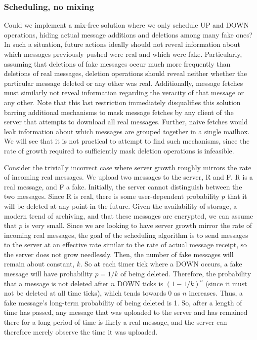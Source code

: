 \documentclass[pageno]{jpaper}
\begin{document}
\subsubsection{Scheduling, no mixing}
Could we implement a mix-free solution where we only schedule UP and DOWN operations, hiding actual message additions and deletions among many fake ones? In such a situation, future actions ideally should not reveal information about which messages previously pushed were real and which were fake. Particularly, assuming that deletions of fake messages occur much more frequently than deletions of real messages, deletion operations should reveal neither whether the particular message deleted or any other was real. Additionally, message fetches must similarly not reveal information regarding the veracity of that message or any other. Note that this last restriction immediately disqualifies this solution barring additional mechanisms to mask message fetches by any client of the server that attempts to download all real messages. Further, naive fetches would leak information about which messages are grouped together in a single mailbox. We will see that it is not practical to attempt to find such mechanisms, since the rate of growth required to sufficiently mask deletion operations is infeasible.

Consider the trivially incorrect case where server growth roughly mirrors the rate of incoming real messages. We upload two messages to the server, R and F. R is a real message, and F a fake. Initially, the server cannot distinguish between the two messages. Since R is real, there is some user-dependent probability $p$ that it will be deleted at any point in the future. Given the availability of storage, a modern trend of archiving, and that these messages are encrypted, we can assume that $p$ is very small. Since we are looking to have server growth mirror the rate of incoming real messages, the goal of the scheduling algorithm is to send messages to the server at an effective rate similar to the rate of actual message receipt, so the server does not grow needlessly. Then, the number of fake messages will remain about constant, $k$. So at each timer tick where a DOWN occurs, a fake message will have probability $p=1/k$ of being deleted. Therefore, the probability that a message is not deleted after $n$ DOWN ticks is $(1-1/k)^n$ (since it must not be deleted at all time ticks), which tends towards 0 as $n$ increases. Thus, a fake message's long-term probability of being deleted is 1. So, after a length of time has passed, any message that was uploaded to the server and has remained there for a long period of time is likely a real message, and the server can therefore merely observe the time it was uploaded.
\end{document}
